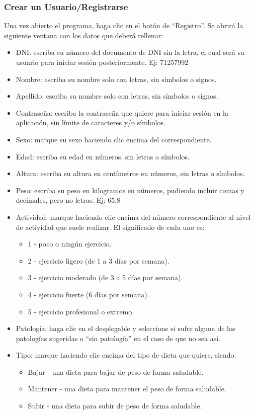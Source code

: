 \subsubsection{Crear un Usuario/Registrarse}
Una vez abierto el programa, haga clic en el botón de “Registro”. 
Se abrirá la siguiente ventana con los datos que deberá rellenar:
\begin{itemize}
\item	DNI: escriba su número del documento de DNI sin la letra, el cual será su usuario para iniciar sesión posteriormente. Ej: 71257992
\item	Nombre: escriba su nombre solo con letras, sin símbolos o signos.
\item	Apellido: escriba su nombre solo con letras, sin símbolos o signos.
\item	Contraseña: escriba la contraseña que quiere para iniciar sesión en la aplicación, sin límite de caracteres y/o símbolos.
\item	Sexo: marque su sexo haciendo clic encima del correspondiente.
\item	Edad: escriba su edad en números, sin letras o símbolos.
\item	Altura: escriba su altura en centímetros en números, sin letras o símbolos.
\item	Peso: escriba su peso en kilogramos en números, pudiendo incluir comas y decimales, pero no letras. Ej: 65,8
\item	Actividad: marque haciendo clic encima del número correspondiente al nivel de actividad que suele realizar. El significado de cada uno es:
\begin{itemize}
\item	1 - poco o ningún ejercicio.
\item	2 - ejercicio ligero (de 1 a 3 días por semana).
\item	3 - ejercicio moderado (de 3 a 5 días por semana).
\item	4 - ejercicio fuerte (6 días por semana).
\item	5 - ejercicio profesional o extremo.
\end{itemize}
\item	Patología: haga clic en el desplegable y seleccione si sufre alguna de las patologías sugeridas o “sin patología” en el caso de que no sea así.
\item	Tipo: marque haciendo clic encima del tipo de dieta que quiere, siendo:
\begin{itemize}
\item	Bajar - una dieta para bajar de peso de forma saludable.
\item	Mantener - una dieta para mantener el peso de forma saludable.
\item	Subir - una dieta para subir de peso de forma saludable.
\end{itemize}
\end{itemize}

